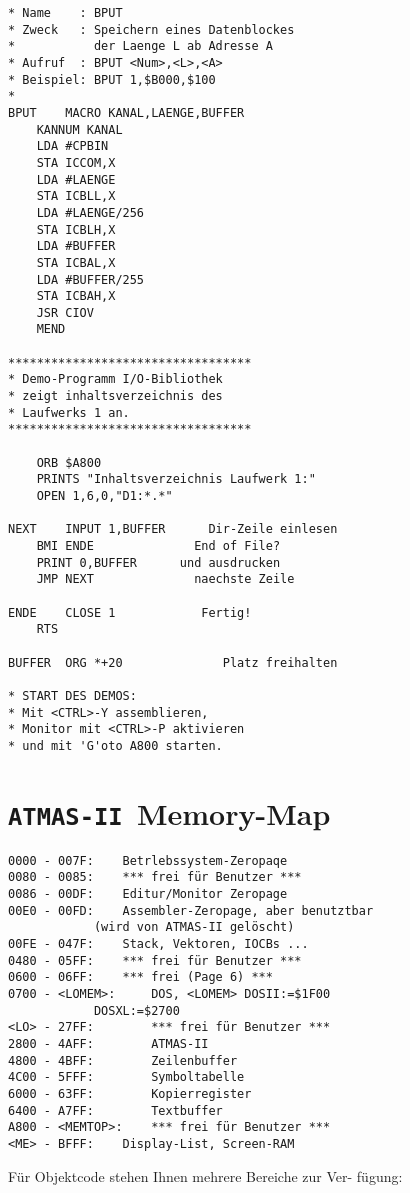 \documentclass[10pt,a4paper,twoside,final,openright,titlepage]{memoir}
\def\atmas{\texttt{AT\-MAS-II }}
\begin{document}
\begin{Verbatim}
* Name    : BPUT
* Zweck   : Speichern eines Datenblockes
*           der Laenge L ab Adresse A
* Aufruf  : BPUT <Num>,<L>,<A>
* Beispiel: BPUT 1,$B000,$100
*
BPUT    MACRO KANAL,LAENGE,BUFFER
	KANNUM KANAL
	LDA #CPBIN
	STA ICCOM,X
	LDA #LAENGE
	STA ICBLL,X
	LDA #LAENGE/256
	STA ICBLH,X
	LDA #BUFFER
	STA ICBAL,X
	LDA #BUFFER/255
	STA ICBAH,X
	JSR CIOV
	MEND

**********************************
* Demo-Programm I/O-Bibliothek
* zeigt inhaltsverzeichnis des
* Laufwerks 1 an.
**********************************

	ORB $A800
	PRINTS "Inhaltsverzeichnis Laufwerk 1:"
	OPEN 1,6,0,"D1:*.*"

NEXT    INPUT 1,BUFFER		Dir-Zeile einlesen
	BMI ENDE		      End of File?
	PRINT 0,BUFFER		und ausdrucken
	JMP NEXT		      naechste Zeile

ENDE    CLOSE 1		       Fertig!
	RTS

BUFFER  ORG *+20		      Platz freihalten

* START DES DEMOS:
* Mit <CTRL>-Y assemblieren,
* Monitor mit <CTRL>-P aktivieren
* und mit 'G'oto A800 starten.
\end{Verbatim}

\appendix

\chapter{\atmas Memory-Map}

\begin{Verbatim}
0000 - 007F:	Betrlebssystem-Zeropaqe
0080 - 0085:	*** frei für Benutzer ***
0086 - 00DF:	Editur/Monitor Zeropage
00E0 - 00FD:	Assembler-Zeropage, aber benutztbar
		    (wird von ATMAS-II gelöscht)
00FE - 047F:	Stack, Vektoren, IOCBs ...
0480 - 05FF:	*** frei für Benutzer ***
0600 - 06FF:	*** frei (Page 6) ***
0700 - <LOMEM>:     DOS, <LOMEM> DOSII:=$1F00
		    DOSXL:=$2700
<LO> - 27FF:        *** frei für Benutzer ***
2800 - 4AFF:        ATMAS-II
4800 - 4BFF:        Zeilenbuffer
4C00 - 5FFF:        Symboltabelle
6000 - 63FF:        Kopierregister
6400 - A7FF:        Textbuffer
A800 - <MEMTOP>:    *** frei für Benutzer ***
<ME> - BFFF:	Display-List, Screen-RAM
\end{Verbatim}

Für Objektcode stehen Ihnen mehrere Bereiche zur Ver-
fügung:
\end{document}
